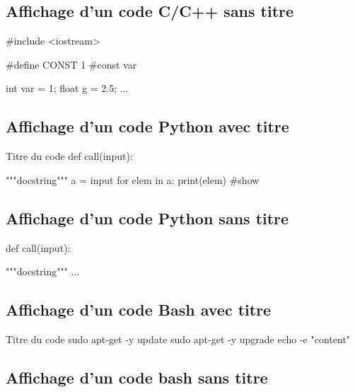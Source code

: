 \subsection{Affichage d'un code C/C++ sans titre}


\begin{Cpp}
#include <iostream>

#define CONST 1 #const var

int var = 1;
float g = 2.5;
...

\end{Cpp}


\subsection{Affichage d'un code Python avec titre}


\begin{Python}{Titre du code}
def call(input):

  """docstring"""
  a = input
  for elem in a:
    print(elem) #show
\end{Python}
\subsection{Affichage d'un code Python sans titre}


\begin{Python}
def call(input):

  """docstring"""
  ...
\end{Python}


\subsection{Affichage d'un code Bash avec titre}


\begin{Bash}{Titre du code}
sudo apt-get -y update
sudo apt-get -y upgrade
echo -e "content"
\end{Bash}
\subsection{Affichage d'un code bash sans titre}






